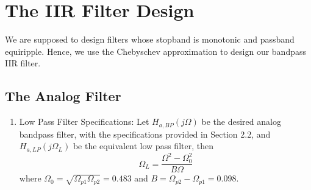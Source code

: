 \documentclass{article}
\begin{document}
\section{The IIR Filter Design}
We are supposed to design filters whose stopband is monotonic and passband equiripple.  
Hence, we use the Chebyschev approximation to design our bandpass IIR filter.
\subsection{The Analog Filter}
\begin{enumerate}

\item {Low Pass Filter Specifications:}  Let $H_{a, BP}(j\Omega)$ be the desired analog bandpass filter,  with the specifications provided in Section 2.2, and $H_{a,LP}(j\Omega_L)$ be the equivalent low pass filter, then
\begin{equation}
\Omega_L = \frac{\Omega^2 - \Omega_0^2}{B\Omega} \label{eq:freq_transform}
\end{equation}
where $\Omega_0 = \sqrt{\Omega_{p1}\Omega_{p2}} = 0.483$ and $B = \Omega_{p2} - \Omega_{p1} = 0.098$.


\end{enumerate}
\end{document}
